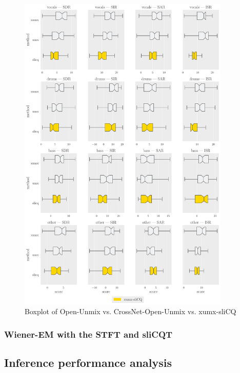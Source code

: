 \documentclass[report.tex]{subfiles}
\begin{document}
\begin{figure}[ht]
	\centering
	\includegraphics[width=0.9\textwidth]{./images-bss/boxplot_full.pdf}
	\caption{Boxplot of Open-Unmix vs. CrossNet-Open-Unmix vs. xumx-sliCQ}
	\label{fig:bssboxplot}
\end{figure}

\newpagefill

\subsubsection{Wiener-EM with the STFT and sliCQT}

\newpagefill

\subsection{Inference performance analysis}

\end{document}
